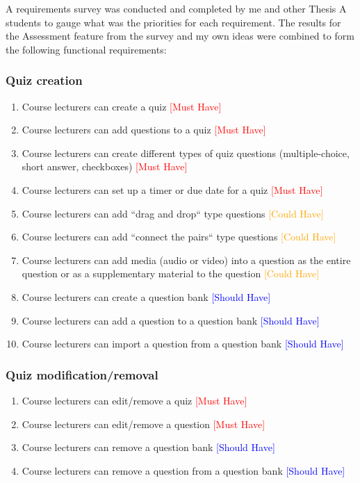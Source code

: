 A requirements survey was conducted and completed by me and other Thesis A students to gauge what was the priorities for each requirement. The results for the Assessment feature from the survey and my own ideas were combined to form the following functional requirements:

\subsubsection{Quiz creation}
\begin{enumerate}
	\item Course lecturers can create a quiz \textcolor{Red}{[Must Have]}
	\item Course lecturers can add questions to a quiz \textcolor{Red}{[Must Have]}
	\item Course lecturers can create different types of quiz questions (multiple-choice, short answer, checkboxes) \textcolor{Red}{[Must Have]}
	\item Course lecturers can set up a timer or due date for a quiz \textcolor{Red}{[Must Have]}
	\item Course lecturers can add ``drag and drop`` type questions \textcolor{Orange}{[Could Have]}
	\item Course lecturers can add ``connect the pairs`` type questions \textcolor{Orange}{[Could Have]}
	\item Course lecturers can add media (audio or  video) into a question as the entire question or as a supplementary material to the question \textcolor{Orange}{[Could Have]}
	\item Course lecturers can create a question bank \textcolor{Blue}{[Should Have]}
	\item Course lecturers can add a question to a question bank \textcolor{Blue}{[Should Have]}
	\item Course lecturers can import a question from a question bank \textcolor{Blue}{[Should Have]}
\end{enumerate}

\subsubsection{Quiz modification/removal}
\begin{enumerate}
	\item Course lecturers can edit/remove a quiz \textcolor{Red}{[Must Have]}
	\item Course lecturers can edit/remove a question \textcolor{Red}{[Must Have]}
	\item Course lecturers can remove a question bank \textcolor{Blue}{[Should Have]}
	\item Course lecturers can remove a question from a question bank \textcolor{Blue}{[Should Have]}
\end{enumerate}

